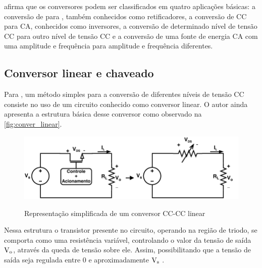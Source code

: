         afirma que os conversores podem ser classificados em quatro aplicações básicas: a conversão de  para , também conhecidos como retificadores, a conversão de CC para CA, conhecidos como inversores, a conversão de determinado nível de tensão CC para outro nível de tensão CC e a conversão de uma fonte de energia CA com uma amplitude e frequência para amplitude e frequência diferentes. 
        
        \subsection{Conversor linear e chaveado} \label{cap:fund_elp_convlc}
            
            Para , um método simples para a conversão de diferentes níveis de tensão CC consiste no uso de um circuito conhecido como conversor linear. O autor ainda apresenta a estrutura básica desse conversor como observado na \autoref{fig:conver_linear}.
            
            \begin{figure}[H]
            	\centering
            	\caption{Representação simplificada de um conversor CC-CC linear}
            	\includegraphics[scale=1]{pdf/outros/conver_linear.pdf}
            	\label{fig:conver_linear}
            \end{figure} 
            
            Nessa estrutura o transistor presente no circuito, operando na região de triodo, se comporta como uma resistência variável, controlando o valor da tensão de saída $\text{V}_\text{o}$, através da queda de tensão sobre ele. Assim, possibilitando que a tensão de saída seja regulada entre 0 e aproximadamente $\text{V}_\text{s}$ \cite{ref:ELP_livro_Hart}.
            
